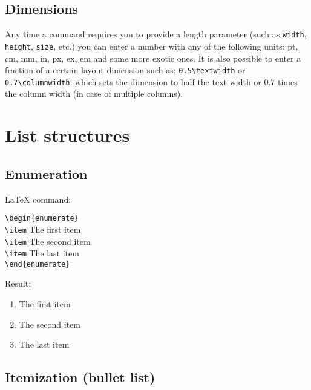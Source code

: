 \documentclass{article}
\begin{document}
\newpage
\subsection{Dimensions}

Any time a command requires you to provide a length parameter (such as \verb|width|, \verb|height|, \verb|size|, etc.) you can enter a number with any of the following units: pt, cm, mm, in, px, ex, em and some more exotic ones. It is also possible to enter a fraction of a certain layout dimension such as: \verb|0.5\textwidth| or \verb|0.7\columnwidth|, which sets the dimension to half the text width or 0.7 times the column width (in case of multiple columns).


\newpage
\section{List structures}

\subsection{Enumeration}

\begin{minipage}[t]{0.5\textwidth}
{\LaTeX} command:
\vspace{3mm}

\verb|\begin{enumerate}|\\
\verb|\item| The first item\\
\verb|\item| The second item\\
\verb|\item| The last item\\
\verb|\end{enumerate}|
\end{minipage}
\begin{minipage}[t]{0.5\textwidth}
Result:
\begin{enumerate}
\item The first item
\item The second item
\item The last item
\end{enumerate}
\end{minipage}

\subsection{Itemization (bullet list)}
\end{document}
